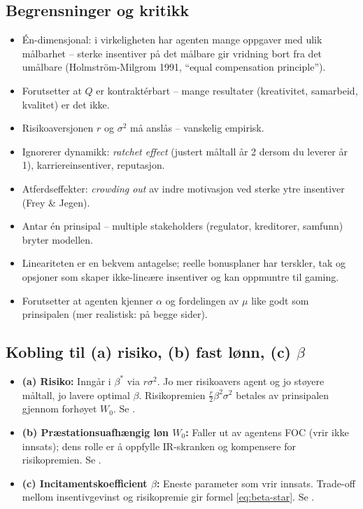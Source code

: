 \subsection*{Begrensninger og kritikk}
\begin{itemize}\setlength{\itemsep}{1pt}
\item Én-dimensjonal: i virkeligheten har agenten mange oppgaver med ulik målbarhet -- sterke insentiver på det målbare gir vridning bort fra det umålbare (Holmström-Milgrom 1991, ``equal compensation principle'').
\item Forutsetter at $Q$ er kontraktérbart -- mange resultater (kreativitet, samarbeid, kvalitet) er det ikke.
\item Risikoaversjonen $r$ og $\sigma^{2}$ må anslås -- vanskelig empirisk.
\item Ignorerer dynamikk: \emph{ratchet effect} (justert måltall år 2 dersom du leverer år 1), karriereinsentiver, reputasjon.
\item Atferdseffekter: \emph{crowding out} av indre motivasjon ved sterke ytre insentiver (Frey \& Jegen).
\item Antar én prinsipal -- multiple stakeholders (regulator, kreditorer, samfunn) bryter modellen.
\item Lineariteten er en bekvem antagelse; reelle bonusplaner har terskler, tak og opsjoner som skaper ikke-lineære insentiver og kan oppmuntre til gaming.
\item Forutsetter at agenten kjenner $\alpha$ og fordelingen av $\mu$ like godt som prinsipalen (mer realistisk:  på begge sider).
\end{itemize}

\subsection*{Kobling til (a) risiko, (b) fast lønn, (c) $\beta$}
\begin{itemize}\setlength{\itemsep}{2pt}
\item \textbf{(a) Risiko:} Inngår i $\beta^{*}$ via $r\sigma^{2}$. Jo mer risikoavers agent og jo støyere måltall, jo lavere optimal $\beta$. Risikopremien $\tfrac{r}{2}\beta^{2}\sigma^{2}$ betales av prinsipalen gjennom forhøyet $W_0$. Se .
\item \textbf{(b) Præstationsuafhængig løn $W_0$:} Faller ut av agentens FOC (vrir ikke innsats); dens rolle er å oppfylle IR-skranken og kompensere for risikopremien. Se .
\item \textbf{(c) Incitamentskoefficient $\beta$:} Eneste parameter som vrir innsats. Trade-off mellom insentivgevinst og risikopremie gir formel \eqref{eq:beta-star}. Se .
\end{itemize}

